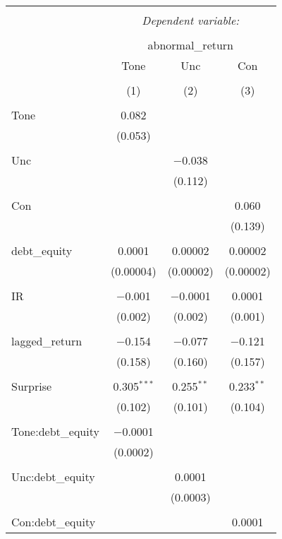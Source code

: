 \documentclass[
]{article}
\begin{document}
\begin{table}[!htbp] \centering 
  \caption{} 
  \label{} 
\begin{tabular}{@{\extracolsep{5pt}}lccc} 
\\[-1.8ex]\hline 
\hline \\[-1.8ex] 
 & \multicolumn{3}{c}{\textit{Dependent variable:}} \\ 
\cline{2-4} 
\\[-1.8ex] & \multicolumn{3}{c}{abnormal\_return} \\ 
 & Tone & Unc & Con \\ 
\\[-1.8ex] & (1) & (2) & (3)\\ 
\hline \\[-1.8ex] 
 Tone & 0.082 &  &  \\ 
  & (0.053) &  &  \\ 
  & & & \\ 
 Unc &  & $-$0.038 &  \\ 
  &  & (0.112) &  \\ 
  & & & \\ 
 Con &  &  & 0.060 \\ 
  &  &  & (0.139) \\ 
  & & & \\ 
 debt\_equity & 0.0001 & 0.00002 & 0.00002 \\ 
  & (0.00004) & (0.00002) & (0.00002) \\ 
  & & & \\ 
 IR & $-$0.001 & $-$0.0001 & 0.0001 \\ 
  & (0.002) & (0.002) & (0.001) \\ 
  & & & \\ 
 lagged\_return & $-$0.154 & $-$0.077 & $-$0.121 \\ 
  & (0.158) & (0.160) & (0.157) \\ 
  & & & \\ 
 Surprise & 0.305$^{***}$ & 0.255$^{**}$ & 0.233$^{**}$ \\ 
  & (0.102) & (0.101) & (0.104) \\ 
  & & & \\ 
 Tone:debt\_equity & $-$0.0001 &  &  \\ 
  & (0.0002) &  &  \\ 
  & & & \\ 
 Unc:debt\_equity &  & 0.0001 &  \\ 
  &  & (0.0003) &  \\ 
  & & & \\ 
 Con:debt\_equity &  &  & 0.0001 \\ 

\end{tabular}
\end{table}
\end{document}
